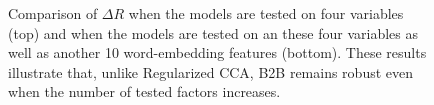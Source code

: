 \begin{figure}
  \caption{Comparison of $\Delta R$ when the models are tested on four variables (top) and when the models are tested on an these four variables as well as another 10 word-embedding features (bottom). These results illustrate that, unlike Regularized CCA, B2B remains robust even when the number of tested factors increases.
  \label{fig:embeddings}}
\end{figure}


